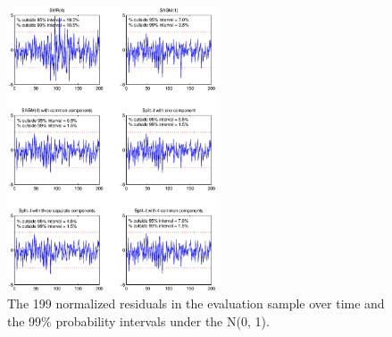 \documentclass[10pt]{beamer}
\begin{document}
\begin{frame}[plain]
\begin{center}
  \begin{figure}
    \includegraphics[height=8.4cm]{normResidPlot.eps}
  \caption{\footnotesize{The 199 normalized residuals in the evaluation sample over
time and  the 99\% probability intervals under the N(0, 1).}} 
  \end{figure}
\end{center}

\end{frame}
\end{document}
